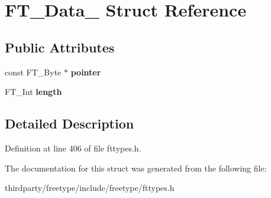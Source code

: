 \hypertarget{struct_f_t___data__}{}\section{F\+T\+\_\+\+Data\+\_\+ Struct Reference}
\label{struct_f_t___data__}
\subsection*{Public Attributes}
\begin{DoxyCompactItemize}
\item 
\mbox{\label{struct_f_t___data___a4dea731b8a256b973757e1b8f612b050}} 
const F\+T\+\_\+\+Byte $\ast$ {\bfseries pointer}
\item 
\mbox{\label{struct_f_t___data___af60c89dccd1852aceb0dc08675aca2fd}} 
F\+T\+\_\+\+Int {\bfseries length}
\end{DoxyCompactItemize}


\subsection{Detailed Description}


Definition at line 406 of file fttypes.\+h.



The documentation for this struct was generated from the following file\+:\begin{DoxyCompactItemize}
\item 
thirdparty/freetype/include/freetype/fttypes.\+h\end{DoxyCompactItemize}
